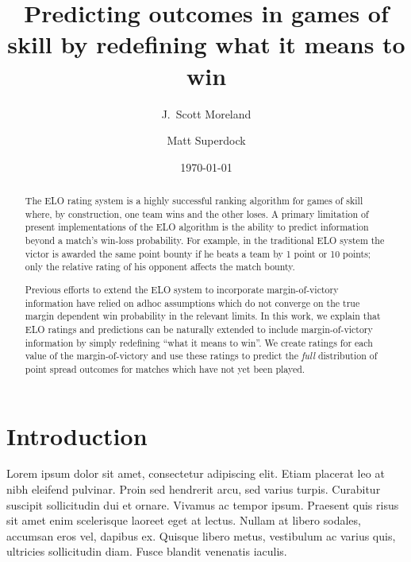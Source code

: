 \documentclass[aps,prc,reprint,amsmath,superscriptaddress]{revtex4-1}
\begin{document}
\title{Predicting outcomes in games of skill by redefining what it means to win}

\author{J.\ Scott Moreland}
\author{Matt Superdock}


\date{\today}


\begin{abstract}
  The ELO rating system is a highly successful ranking algorithm for games of skill where, by construction, one team wins and the other loses.
  A primary limitation of present implementations of the ELO algorithm is the ability to predict information beyond a match's win-loss probability.
  For example, in the traditional ELO system the victor is awarded the same point bounty if he beats a team by 1 point or 10 points; only the relative rating of his opponent affects the match bounty.

Previous efforts to extend the ELO system to incorporate margin-of-victory information have relied on adhoc assumptions which do not converge on the true margin dependent win probability in the relevant limits.
  In this work, we explain that ELO ratings and predictions can be naturally extended to include margin-of-victory information by simply redefining ``what it means to win''.
  We create ratings for each value of the margin-of-victory and use these ratings to predict the \emph{full} distribution of point spread outcomes for matches which have not yet been played.
\end{abstract}


\maketitle

\section{Introduction}

Lorem ipsum dolor sit amet, consectetur adipiscing elit. Etiam placerat leo at nibh eleifend pulvinar. Proin sed hendrerit arcu, sed varius turpis. Curabitur suscipit sollicitudin dui et ornare. Vivamus ac tempor ipsum. Praesent quis risus sit amet enim scelerisque laoreet eget at lectus. Nullam at libero sodales, accumsan eros vel, dapibus ex. Quisque libero metus, vestibulum ac varius quis, ultricies sollicitudin diam. Fusce blandit venenatis iaculis.
\end{document}
